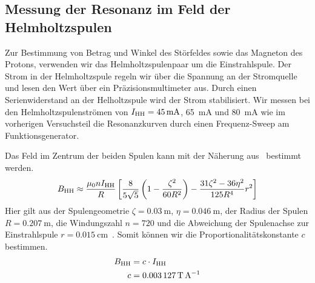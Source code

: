 \documentclass[paper=a4,
	fontsize=10pt,
	DIV=18,
	twocolumn,
	parskip=half
	]{scrartcl}
\numberwithin{equation}{section}    %
\begin{document}
\subsection{Messung der Resonanz im Feld der Helmholtzspulen}
\label{auswertung6}

Zur Bestimmung von Betrag und Winkel des Störfeldes sowie das Magneton des Protons, verwenden wir das Helmholtzspulenpaar um die Einstrahlspule. Der Strom in der Helmholtzspule regeln wir über die Spannung an der Stromquelle und lesen den Wert über ein Präzisionsmultimeter aus. Durch einen Serienwiderstand an der Helholtzspule wird der Strom stabilisiert. Wir messen bei den Helmholtzspulenströmen von $I_{\rm HH} = \SI{45}{\milli\ampere}$, \SI{65}{\milli\ampere} und \SI{80}{\milli\ampere} wie im vorherigen Versuchsteil die Resonanzkurven durch einen Frequenz-Sweep am Funktionsgenerator. 

Das Feld im Zentrum der beiden Spulen kann mit der Näherung aus~\citet{anleitung} bestimmt werden.
\begin{equation}
	B_{\rm HH} \approx \frac{\mu_0 n I_{\rm HH}}{R} \left[ \frac{8}{5\sqrt{5}} \left( 1 - \frac{\zeta^2}{60R^2} \right) - \frac{31\zeta^2 - 36\eta^2}{125 R^4}r^2\right]
\end{equation}
Hier gilt aus der Spulengeometrie $\zeta=\SI{0.03}{\meter}$, $\eta=\SI{0.046}{\meter}$, der Radius der Spulen $R=\SI{0.207}{\meter}$, die Windungszahl $n=720$ und die Abweichung der Spulenachse zur Einstrahlspule $r=\SI{0.015}{\centi\meter}$~\citep{anleitung}. Somit können wir die Proportionalitätskonstante $c$ bestimmen.
\begin{align}
	B_{\rm HH} &= c\cdot I_{\rm HH}\\
	c &= \SI{0.003127}{\tesla\per\ampere}
\end{align}
\end{document}
